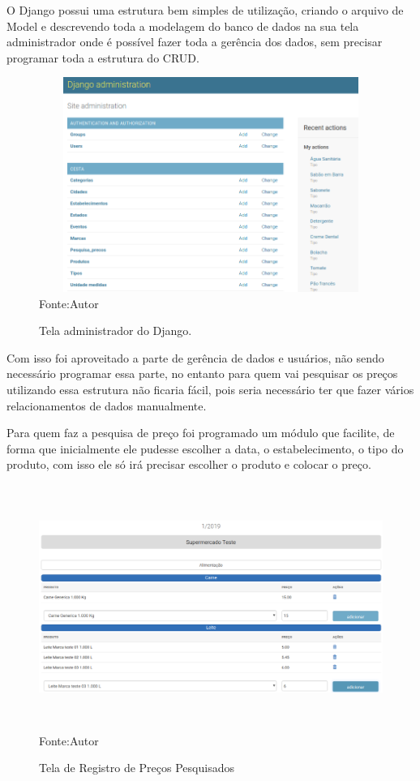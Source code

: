 \documentclass{ifto-tex}
\begin{document}
O Django possui uma estrutura bem simples de utilização, criando o arquivo de Model e descrevendo toda a modelagem do banco de dados na sua tela administrador onde é possível fazer toda a gerência dos dados, sem precisar programar toda a estrutura do CRUD.

\begin{figure}[H]
	\begin{center}
		\includegraphics[width=16.0cm, height= 7.0cm]{cestaadmin.png}    %
		Fonte:Autor
		\caption{Tela administrador do Django.} 
		\label{fig:faces}
	\end{center}
\end{figure}
Com isso foi aproveitado a parte de gerência de dados e usuários, não sendo necessário programar essa parte, no entanto para quem vai pesquisar os preços utilizando essa estrutura não ficaria fácil, pois seria necessário ter que fazer vários relacionamentos de dados manualmente.

Para quem faz a pesquisa de preço foi programado um módulo que facilite, de forma que inicialmente ele pudesse escolher a data, o estabelecimento, o tipo do produto, com isso ele só irá precisar escolher o produto e colocar o preço.

\begin{figure}[H]
	\begin{center}
		\includegraphics[width=16.0cm, height= 8.0cm]{cestacadastro.png}    %
		Fonte:Autor
		\caption{Tela de Registro de Preços Pesquisados} 
		\label{fig:faces}
	\end{center}
\end{figure}
\end{document}
